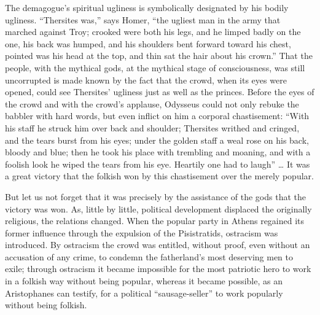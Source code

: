 \documentclass[12pt]{book}
\newcommand{\opage}[1]{\marginnote{\footnotesize\textit{[#1]}}}
\begin{document}
The demagogue's spiritual ugliness is symbolically designated by his
bodily ugliness. ``Thersites was,'' says Homer, ``the ugliest man in the
army that marched against Troy; crooked were both his legs, and he
limped badly on the one, his back was humped, and his shoulders bent
forward toward his chest, pointed was his head at the top, and thin sat
the hair about his crown.'' That the people, with the mythical gods, at
the mythical stage of consciousness, was still uncorrupted is made known
by the fact that the crowd, when its eyes were opened, could see
Thersites' ugliness just as well as the princes. Before the eyes of the
crowd and with the crowd's applause, Odysseus could not only rebuke the
babbler with hard words, but even inflict on him a corporal
chastisement: ``With his staff he struck him over back and shoulder;
Thersites writhed and cringed, and the tears burst from his eyes; under
the golden staff a weal rose on his back, bloody and blue; then he took
his place with trembling and moaning, and with a foolish look he wiped
the tears from his eye. Heartily one had to laugh'' \ldots{} It was a
great victory that the folkish won by this chastisement over the merely
popular.

But let us not forget that it was precisely by the assistance of the gods
that the victory was won. As, little by little,
\opage{132}\setcounter{footnote}{0}%
political development displaced the originally religious, the
relations changed. When the popular party in Athens regained its former
influence through the expulsion of the Pisistratids, ostracism was
introduced. By ostracism the crowd was entitled, without proof, even
without an accusation of any crime, to condemn the fatherland's most
deserving men to exile; through ostracism it became impossible for the
most patriotic hero to work in a folkish way without being popular,
whereas it became possible, as an Aristophanes can testify, for a
political ``sausage-seller'' to work popularly without being folkish.
\end{document}
